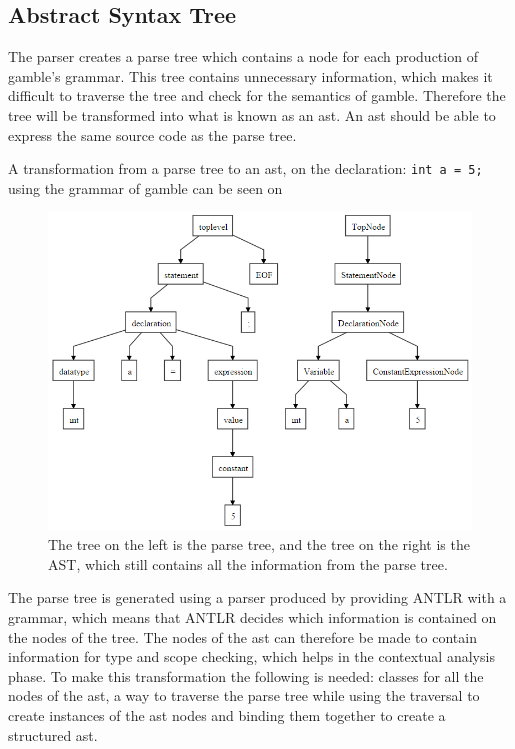 \subsection*{Abstract Syntax Tree}\label{sec:AST}
The parser creates a parse tree which contains a node for each production of \gls{gamble}'s grammar.
This tree contains unnecessary information, which makes it difficult to traverse the tree and check for the semantics of \gls{gamble}.
Therefore the tree will be transformed into what is known as an \acrfull{ast}.
An \acrshort{ast} should be able to express the same source code as the parse tree.


A transformation from a parse tree to an \acrshort{ast}, on the declaration: \texttt{int a = 5;} using the grammar of \gls{gamble} can be seen on 

\begin{figure}
		\centering
	 	\includegraphics[width=0.8\linewidth]{figures/Trees/AST.PNG}
		\caption{The tree on the left is the parse tree, and the tree on the right is the AST, which still contains all the information from the parse tree.}\label{image:AST}
\end{figure}

The parse tree is generated using a parser produced by providing ANTLR with a grammar, which means that ANTLR decides which information is contained on the nodes of the tree.
The nodes of the \acrshort{ast} can therefore be made to contain information for type and scope checking, which helps in the contextual analysis phase.
To make this transformation the following is needed: classes for all the nodes of the \acrshort{ast}, a way to traverse the parse tree while using the traversal to create instances of the \acrshort{ast} nodes and binding them together to create a structured \acrshort{ast}.



